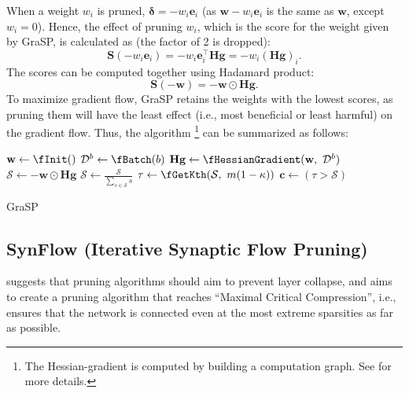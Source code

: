 When a weight $w_i$ is pruned, $\boldsymbol{\delta} = -w_i\textbf{e}_i$ (as $\textbf{w} - w_i\textbf{e}_i$ is the same as $\textbf{w}$, except $w_i=0$). Hence, the effect of pruning $w_i$, which is the score for the weight given by GraSP, is calculated as (the factor of 2 is dropped):
$$\textbf{S}(-w_i\textbf{e}_i) = -w_i\textbf{e}_i^\top \textbf{H}\textbf{g} = -w_i(\textbf{H}\textbf{g})_i.$$
The scores can be computed together using Hadamard product:
$$\textbf{S}(-\textbf{w}) = - \textbf{w} \odot \textbf{Hg}.$$
To maximize gradient flow, GraSP retains the weights with the lowest scores, as pruning them will have the least effect (i.e., most beneficial or least harmful) on the gradient flow. Thus, the algorithm \footnote[4]{The Hessian-gradient is computed by building a computation graph. See \textcite{grasp20} for more details.} can be summarized as follows:
\begin{algorithm}[!h]
\AlgoFontSize
\DontPrintSemicolon


\BlankLine
$\textbf{w} \gets \fInit()$\;
$\mathcal{D}^b \gets \fBatch(b)$ 
$\textbf{Hg} \gets \fHessianGradient(\textbf{w}, \ \mathcal{D}^b)$ 
$\mathcal{S} \gets - \textbf{w} \odot \textbf{Hg}$ 
$\mathcal{S} \gets \frac{\mathcal{S}}{\sum_{s \in \mathcal{S}} s}$  
$\tau \gets \fGetKth(\mathcal{S}, \ m(1-\kappa))$ 
$\textbf{c} \gets (\tau > \mathcal{S})$ 

\caption{GraSP}
\label{GraSP:algo}
\end{algorithm}

\subsection{SynFlow (Iterative Synaptic Flow Pruning)}

\textcite{synflow20} suggests that pruning algorithms should aim to prevent layer collapse, and aims to create a pruning algorithm that reaches ``Maximal Critical Compression”, i.e., ensures that the network is connected even at the most extreme sparsities as far as possible.


